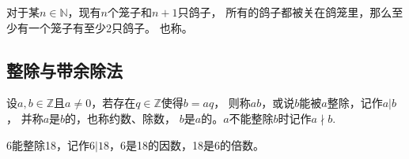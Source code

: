 
\begin{theorem}\label{theorem:7.ex02.2}
    对于某$n\in\mathbb{N}$，现有$n$个笼子和$n+1$只鸽子，
    所有的鸽子都被关在鸽笼里，那么至少有一个笼子有至少2只鸽子。
    也称。
\end{theorem}

\subsection{整除与带余除法}\label{sub:整除与带余除法}
\begin{definition}
    设$a,b\in\mathbb{Z}$且$a\neq0$，若存在$q\in\mathbb{Z}$使得$b=aq$，
    则称$a$$b$，或说$b$能被$a$整除，记作$a|b$，
    并称$a$是$b$的，也称{\sffamily 约数}、{\sffamily 除数}，
    $b$是$a$的。$a$不能整除$b$时记作$a\nmid b$.
\end{definition}

\begin{example}
    6能整除18，记作$6|18$，6是18的因数，18是6的倍数。
\end{example}

